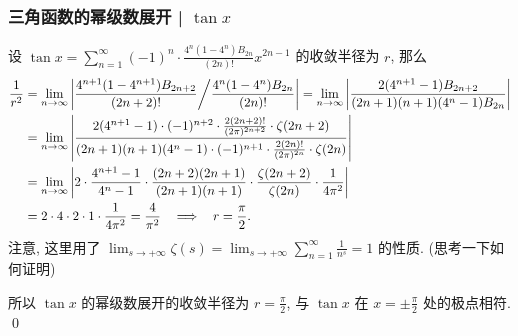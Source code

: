 
\begin{frame}
\frametitle{三角函数的幂级数展开 | $\tan x$}

设 $\tan x = \sum_{n=1}^\infty (-1)^n \cdot \frac{4^n (1 - 4^n) B_{2n}}{(2n)!} x^{2n-1}$ 的收敛半径为 $r$, 那么
\begin{align*}
\frac{1}{r^2} & = \lim_{n \to \infty} \left| \frac{4^{n+1} (1 - 4^{n+1}) B_{2n+2}}{(2n+2)!} \middle/ \frac{4^n (1 - 4^n) B_{2n}}{(2n)!} \right| = \lim_{n \to \infty} \left| \frac{2 (4^{n+1} - 1) B_{2n+2}}{(2n + 1)(n + 1) (4^n - 1) B_{2n}} \right| \\
& = \lim_{n \to \infty} \left| \frac{2 (4^{n+1} - 1) \cdot (-1)^{n+2} \cdot \frac{2 (2n+2)!}{(2\pi)^{2n+2}} \cdot \zeta(2n+2)}{(2n + 1)(n + 1) (4^n - 1) \cdot (-1)^{n+1} \cdot \frac{2 (2n)!}{(2\pi)^{2n}} \cdot \zeta(2n)} \right| \\
& = \lim_{n \to \infty} \left| 2 \cdot \frac{4^{n+1} - 1}{4^n - 1} \cdot \frac{(2n+2)(2n+1)}{(2n + 1)(n + 1)} \cdot \frac{\zeta(2n+2)}{\zeta(2n)} \cdot \frac{1}{4\pi^2} \right| \\
& = 2 \cdot 4 \cdot 2 \cdot 1 \cdot \frac{1}{4\pi^2} = \frac{4}{\pi^2} ~~ \implies ~~ r = \frac{\pi}{2}.
\end{align*}
注意, 这里用了 $\lim_{s \to +\infty} \zeta(s) = \lim_{s \to +\infty} \sum_{n=1}^\infty \frac{1}{n^s} = 1$ 的性质. (\alert{思考一下如何证明})

\pause
\vspace{0.5em}

所以 $\tan x$ 的幂级数展开的收敛半径为 $r = \frac{\pi}{2}$, 与 $\tan x$ 在 $x = \pm \frac{\pi}{2}$ 处的极点相符.
\qed

\end{frame}



